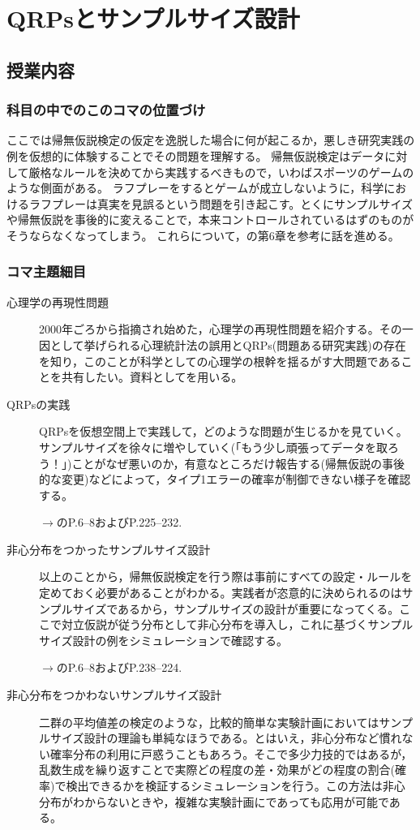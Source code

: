 \section{QRPsとサンプルサイズ設計}
\subsection{授業内容}
\subsubsection{科目の中でのこのコマの位置づけ}
ここでは帰無仮説検定の仮定を逸脱した場合に何が起こるか，悪しき研究実践の例を仮想的に体験することでその問題を理解する。
帰無仮説検定はデータに対して厳格なルールを決めてから実践するべきもので，いわばスポーツのゲームのような側面がある。
ラフプレーをするとゲームが成立しないように，科学におけるラフプレーは真実を見誤るという問題を引き起こす。とくにサンプルサイズや帰無仮説を事後的に変えることで，本来コントロールされているはずのものがそうならなくなってしまう。
これらについて，\textcite{kosugi2023}の第6章を参考に話を進める。
\subsubsection{コマ主題細目}
\begin{description}
	\item[心理学の再現性問題] 2000年ごろから指摘され始めた，心理学の再現性問題を紹介する。その一因として挙げられる心理統計法の誤用とQRPs(問題ある研究実践)の存在を知り，このことが科学としての心理学の根幹を揺るがす大問題であることを共有したい。資料として\textcite{Ikeda2016}を用いる。
	\item[QRPsの実践] QRPsを仮想空間上で実践して，どのような問題が生じるかを見ていく。サンプルサイズを徐々に増やしていく(「もう少し頑張ってデータを取ろう！」)ことがなぜ悪いのか，有意なところだけ報告する(帰無仮説の事後的な変更)などによって，タイプ1エラーの確率が制御できない様子を確認する。
	      \begin{flushright}
		      $\to$\textcite{kosugi2023}のP.6--8およびP.225--232.
	      \end{flushright}
	\item[非心分布をつかったサンプルサイズ設計] 以上のことから，帰無仮説検定を行う際は事前にすべての設定・ルールを定めておく必要があることがわかる。実践者が恣意的に決められるのはサンプルサイズであるから，サンプルサイズの設計が重要になってくる。ここで対立仮説が従う分布として非心分布を導入し，これに基づくサンプルサイズ設計の例をシミュレーションで確認する。
	      \begin{flushright}
		      $\to$\textcite{kosugi2023}のP.6--8およびP.238--224.
	      \end{flushright}
	\item[非心分布をつかわないサンプルサイズ設計] 二群の平均値差の検定のような，比較的簡単な実験計画においてはサンプルサイズ設計の理論も単純なほうである。とはいえ，非心分布など慣れない確率分布の利用に戸惑うこともあろう。そこで多少力技的ではあるが，乱数生成を繰り返すことで実際どの程度の差・効果がどの程度の割合(確率)で検出できるかを検証するシミュレーションを行う。この方法は非心分布がわからないときや，複雑な実験計画にであっても応用が可能である。
\end{description}
